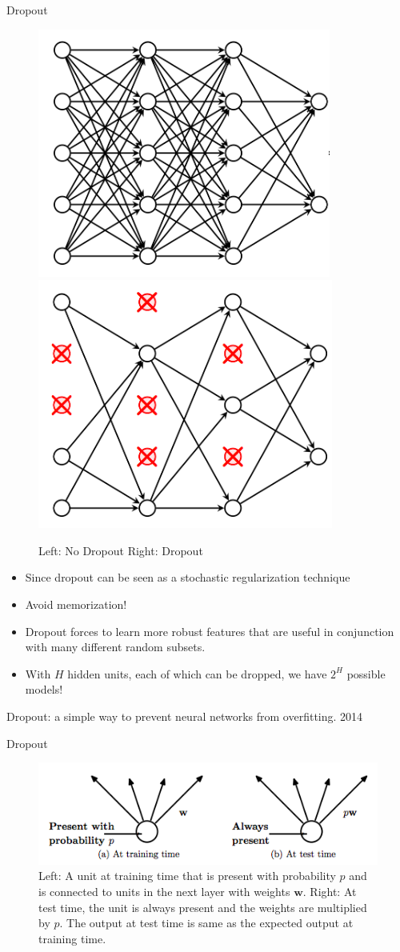 \documentclass[xcolor=pdftex,dvipsnames,table,mathserif]{beamer}
\begin{document}
\begin{frame}{Dropout}
\begin{figure}
\includegraphics[width=.45 \columnwidth]{../graphics/NetworkDropoutNo}
\includegraphics[width=.45 \columnwidth]{../graphics/NetworkDropoutYes}
\caption{Left: No Dropout Right: Dropout}
\end{figure}
\begin{itemize}
\item Since dropout can be seen as a stochastic regularization technique
\item Avoid memorization!
\item Dropout forces to learn more robust features that are useful in conjunction with many different random subsets.
\item With $H$ hidden units, each of which can be dropped, we have $2^H$ possible models!
\end{itemize}
Dropout: a simple way to prevent neural networks from overfitting. \cite{srivastava2014dropout} 2014
\end{frame}

\begin{frame}{Dropout}
\begin{figure}
\includegraphics[width=.85 \columnwidth]{../graphics/DropoutP}
\caption{Left: A unit at training time that is present with probability $p$ and is connected to units
in the next layer with weights $\mathbf{w}$. Right: At test time, the unit is always present and
the weights are multiplied by $p$. The output at test time is same as the expected output
at training time.}
\end{figure}
\end{frame}
\end{document}
